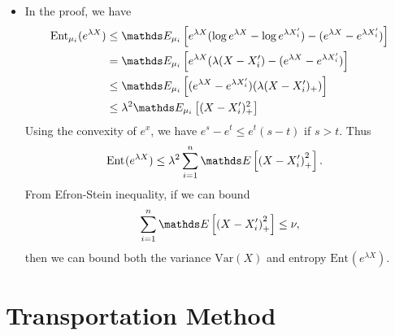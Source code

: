 \documentclass[11pt]{article}
\begin{document}
\begin{itemize}
\item \begin{remark}
In the proof, we have 
\begin{align*}
\text{Ent}_{\mu_i}(e^{\lambda X}) &\le \E{\mu_i}{e^{\lambda X}(\log e^{\lambda X} - \log e^{\lambda X_i'}) - (e^{\lambda X} - e^{\lambda X_i'})}\\
&= \E{\mu_i}{e^{\lambda X}(\lambda (X - X_i') - (e^{\lambda X} - e^{\lambda X_i'})}\\
&\le \E{\mu_i}{(e^{\lambda X} - e^{\lambda X_i'})(\lambda (X - X_i')_{+}) } \\
&\le \lambda^2 \E{\mu_i}{(X - X_i')_{+}^2 } 
\end{align*}
Using the convexity of $e^x$, we have $e^s - e^t \le e^t(s- t)$ if $s > t$. Thus
\begin{align*}
\text{Ent}_{}(e^{\lambda X}) &\le \lambda^2 \sum_{i=1}^{n} \E{}{ \paren{X - X_i'}_{+}^2 }.
\end{align*}  From Efron-Stein inequality, if we can bound
\begin{align*}
  \sum_{i=1}^{n}\E{}{\paren{X -  X_i'}_{+}^2} \le \nu,
\end{align*} then we can bound both the variance $\text{Var}(X)$ and entropy $\text{Ent}_{}(e^{\lambda X})$.
\end{remark}
\end{itemize}


\section{Transportation Method}
\end{document}
